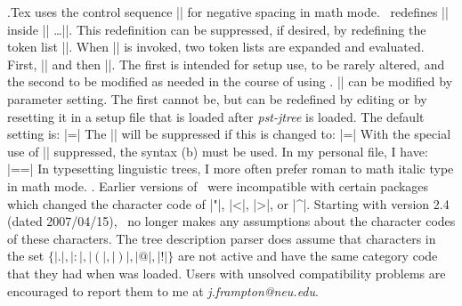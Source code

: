 .\enspace Tex uses the control sequence |\!| for negative
spacing in math mode.  \jTree\ redefines |\!| inside |\jtree|
\dots|\endjtree|. This redefinition can be suppressed, if
desired, by redefining the token list |\jtEverytree|.  When
|\jtree| is invoked, two token lists are expanded and evaluated.
First, |\jtEverytree| and then
|\jteverytree|. The first is intended for
setup use, to be rarely altered, and the second to be modified as
needed in the course of using \jTree. |\jteverytree| can be
modified by parameter setting.  The first cannot be, but can be
redefined by editing \pstjtree\/ or by resetting it in a setup
file that is loaded after {\sl pst-jtree\/} is loaded.  The
default setting is:
\medskip
\hfil|\jtEverytree={\let\!\adjoinop}|
\medskip
The |\!| will be suppressed if this is changed to:
\medskip
\hfil|\jtEverytree={}|
\medskip
With the special use of |\!| suppressed,
the syntax (\lastx b) must be used.\medskip
In my personal file, I have:
\medskip
\hfil|\jtEverytree={\everymath={\rm}\let\!\adjoinop}|
\medskip
In typesetting linguistic trees, I more often prefer roman
to math italic type in math mode.
.\enspace
Earlier versions of \jTree\ were incompatible with certain
packages which changed the character code of |"|, |<|, |>|, or
|^|.  Starting with version 2.4 (dated 2007/04/15), \jTree\ no
longer makes any assumptions about the character codes of these
characters.  The tree description parser does assume that
characters in the set $\{|.|,|:|,|(|,|)|,|@|,|!|\}$ are not
active and have the same category code that they had when
\pstjtree\/ was loaded.
Users with unsolved compatibility problems are encouraged
to report them to me at {\sl j.frampton@neu.edu\/}.





